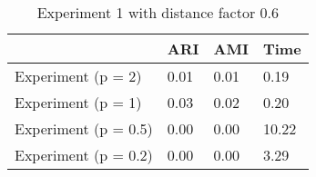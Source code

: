\begin{table}
\centering
\caption{Experiment 1 with distance factor 0.6}
\begin{tabular}{llll}
\toprule
{} &   ARI &   AMI &   Time \\
\midrule
Experiment (p = 2)   &  0.01 &  0.01 &   0.19 \\
Experiment (p = 1)   &  0.03 &  0.02 &   0.20 \\
Experiment (p = 0.5) &  0.00 &  0.00 &  10.22 \\
Experiment (p = 0.2) &  0.00 &  0.00 &   3.29 \\
\bottomrule
\end{tabular}
\end{table}
